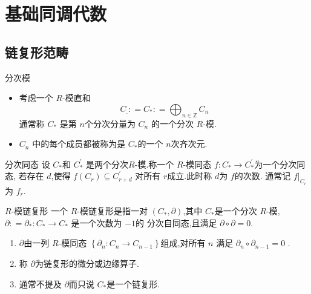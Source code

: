 \documentclass[../../几何与拓扑.tex]{subfiles}
\begin{document}
    

\chapter{基础同调代数}

\section{链复形范畴}

\begin{definition}{分次模}
    \begin{itemize}
        \item 考虑一个 \(  R  \)-模直和 \[
            C_{.}: =  C_{{*}}: = \bigoplus _{n \in \mathbb{Z}}C_{n}
            \] 通常称 \(  C_{*}  \) 是第 \(  n  \)个分次分量为 \(  C_{n}  \)  的一个分次 \(  R  \)-模.
        \item      \(  C_{n}  \)  中的每个成员都被称为是 \(  C_{*}  \)的一个 \(  n  \)次齐次元.  
    \end{itemize}
    
\end{definition}

\begin{definition}{分次同态}
    设 \(  C_{*}  \)和 \(  C_{*}^{\prime}   \)  是两个分次\(  R  \)-模.称一个 \(  R  \)-模同态 \(  f: C_{*}\to C_{*}^{\prime}   \)为一个分次同态,
    若存在 \(  d  \),使得 \(  f\left( C_{r} \right)\subseteq C_{r+ d}^{\prime}    \)     对所有 \(  r  \)成立.此时称 \(  d  \)为 \(  f  \)的次数.
    通常记 \(  f|_{C_{r}}  \)为 \(  f_{r}  \).     
\end{definition}

\begin{definition}{\(  R  \)-模链复形  }
    一个 \(  R  \)-模链复形是指一对 \(  \left( C_{*},\partial  \right)   \),其中 \(  C_{*}  \)是一个分次 \(  R  \)-模, \(  \partial : =  \partial _{*}: C_{*}\to C_{*}  \)     
    是一个次数为 \(  -1  \)的 分次自同态,且满足 \(  \partial \circ \partial = 0  \).  
    
\end{definition}

\begin{remark}
    \begin{enumerate}
        \item \(  \partial   \)由一列 \(  R  \)-模同态 \(  \left\{ \partial _{n}: C_{n}\to C_{n-1} \right\}  \)组成,对所有 \(  n  \) 满足 \(  \partial _{n}\circ \partial _{n-1}= 0  \)   .
        \item 称 \(  \partial   \)为链复形的微分或边缘算子.
        \item 通常不提及 \(  \partial   \)而只说 \(  C_{*}  \)是一个链复形.    
    \end{enumerate}
    
\end{remark}
\end{document}
